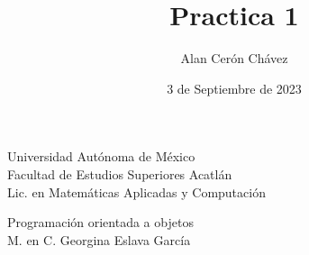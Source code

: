 \documentclass[12pt]{article}
\author{Alan Cerón Chávez}
\title{Practica 1}
\date{3 de Septiembre de 2023}
\begin{document}
\maketitle
\thispagestyle{empty}

\begin{center}
    \LARGE{Universidad Autónoma de México}\\\medskip
    \Large{Facultad de Estudios Superiores Acatlán}\\
    \Large{Lic. en Matemáticas Aplicadas y Computación}\\\medskip

    \large{Programación orientada a objetos}\\
    \large{M. en C. Georgina Eslava García}\\\medskip
\end{center}
\end{document}
